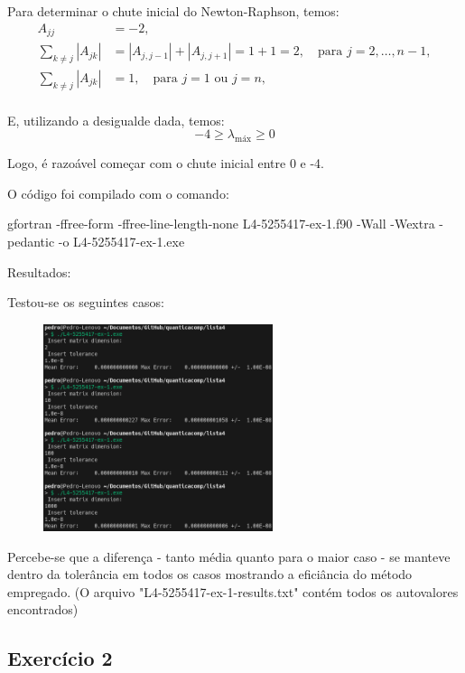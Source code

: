 \documentclass[12pt, a4paper]{article} %
\begin{document}
        Para determinar o chute inicial do Newton-Raphson, temos:
        \begin{align*}
            A_{jj} &= -2, \\
            \sum_{k \ne j} |A_{jk}| &= |A_{j, j-1}| + |A_{j, j+1}| = 1 + 1 = 2, \quad \text{para } j = 2, \ldots, n-1, \\
            \sum_{k \ne j} |A_{jk}| &= 1, \quad \text{para } j = 1 \text{ ou } j = n, \\
        \end{align*}

        E, utilizando a desigualde dada, temos:
        \begin{equation*}
            -4 \geq \lambda_{\text{máx}} \geq 0
        \end{equation*}

        Logo, \'e razoável começar com o chute inicial entre 0 e -4.

        O c\'odigo foi compilado com o comando:

gfortran -ffree-form -ffree-line-length-none L4-5255417-ex-1.f90 -Wall -Wextra -pedantic -o L4-5255417-ex-1.exe 

        Resultados:

        Testou-se os seguintes casos:
        \begin{figure}[H]
            \centering
            \includegraphics[width=0.6\textwidth]{../images/ex1-input.png}
        \end{figure}

        Percebe-se que a diferen\c{c}a - tanto m\'edia quanto para o maior caso - se manteve dentro da toler\^ancia em todos os casos mostrando a efici\^ancia do m\'etodo empregado. (O arquivo "L4-5255417-ex-1-results.txt" contém todos os autovalores encontrados)

    \subsection{Exerc\'icio 2}
\end{document}
